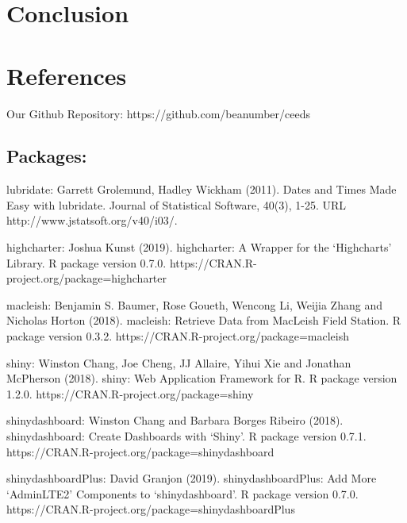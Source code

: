 \documentclass[10pt,letterpaper]{article}
\begin{document}
\section{Conclusion}\label{conclusion}

\section*{References}\label{references}

Our Github Repository: https://github.com/beanumber/ceeds

\subsection{Packages:}\label{packages}

lubridate: Garrett Grolemund, Hadley Wickham (2011). Dates and Times
Made Easy with lubridate. Journal of Statistical Software, 40(3), 1-25.
URL http://www.jstatsoft.org/v40/i03/.

highcharter: Joshua Kunst (2019). highcharter: A Wrapper for the
`Highcharts' Library. R package version 0.7.0.
https://CRAN.R-project.org/package=highcharter

macleish: Benjamin S. Baumer, Rose Goueth, Wencong Li, Weijia Zhang and
Nicholas Horton (2018). macleish: Retrieve Data from MacLeish Field
Station. R package version 0.3.2.
https://CRAN.R-project.org/package=macleish

shiny: Winston Chang, Joe Cheng, JJ Allaire, Yihui Xie and Jonathan
McPherson (2018). shiny: Web Application Framework for R. R package
version 1.2.0. https://CRAN.R-project.org/package=shiny

shinydashboard: Winston Chang and Barbara Borges Ribeiro (2018).
shinydashboard: Create Dashboards with `Shiny'. R package version 0.7.1.
https://CRAN.R-project.org/package=shinydashboard

shinydashboardPlus: David Granjon (2019). shinydashboardPlus: Add More
`AdminLTE2' Components to `shinydashboard'. R package version 0.7.0.
https://CRAN.R-project.org/package=shinydashboardPlus

\nolinenumbers
\end{document}
